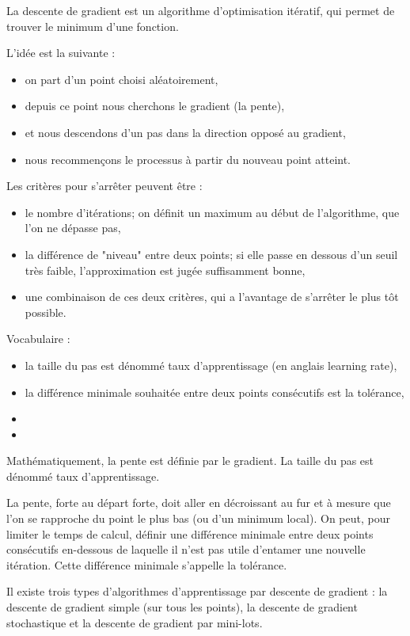 \documentclass[10pt,french]{report}
\begin{document}
	La descente de gradient est un algorithme d’optimisation itératif, qui permet de trouver le minimum d'une fonction.

	L'idée est la suivante :
	\begin{itemize}
		\item on part d'un point choisi aléatoirement,
		\item depuis ce point nous cherchons le gradient (la pente),
		\item et nous descendons d'un pas dans la direction opposé au gradient,
		\item nous recommençons le processus à partir du nouveau point atteint.
	\end{itemize}

	Les critères pour s'arrêter peuvent être :
	\begin{itemize}
		\item le nombre d'itérations; on définit un maximum au début de l'algorithme, que l'on ne dépasse pas,
		\item la différence de "niveau" entre deux points; si elle passe en dessous d'un seuil très faible, l'approximation est jugée suffisamment bonne,
		\item une combinaison de ces deux critères, qui a l'avantage de s'arrêter le plus tôt possible.
	\end{itemize}

	Vocabulaire :
	\begin{itemize}
		\item la taille du pas est dénommé taux d'apprentissage (en anglais learning rate),
		\item la différence minimale souhaitée entre deux points consécutifs est la tolérance,
		\item
		\item
	\end{itemize}
	Mathématiquement, la pente est définie par le gradient. La taille du pas est dénommé taux d'apprentissage.

	La pente, forte au départ forte, doit aller en décroissant au fur et à mesure que l'on se rapproche du point le plus bas (ou d'un minimum local). On peut, pour limiter le temps de calcul, définir une différence minimale entre deux points consécutifs en-dessous de laquelle il n'est pas utile d'entamer une nouvelle itération. Cette différence minimale s'appelle la tolérance.

	Il existe trois types d'algorithmes d'apprentissage par descente de gradient : la descente de gradient simple (sur tous les points), la descente de gradient stochastique et la descente de gradient par mini-lots.
\end{document}
